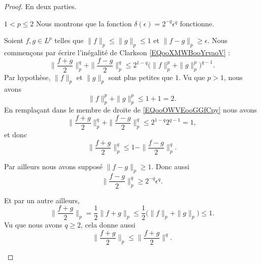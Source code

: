 \begin{proof}
    En deux parties.

    \begin{subproof}
        \item[\( 1<p\leq 2\)]
            Nous montrons que la fonction \( \delta(\epsilon)=2^{-q}\epsilon^q\) fonctionne.
            
            Soient \( f,g\in L^p\) telles que \( \| f \|_p\leq \| g \|_p\leq 1\) et \( \| f-g \|_p\geq \epsilon\). Nous commençons par écrire l'inégalité de Clarkson \eqref{EQooXMWBooYrvaoV} :
            \begin{equation}        \label{EQooOWVEooGGfCpy}
                \| \frac{ f+g }{2} \|_p^q+\| \frac{ f-g }{2} \|_p^q\leq 2^{1-q}\big( \| f \|_p^p+\| g \|_p^p \big)^{q-1}.
            \end{equation}
            Par hypothèse, \( \| f \|_p\) et \( \| g \|_p\) sont plus petites que \( 1\). Vu que \( p>1\), nous avons
            \begin{equation}
                \| f \|_p^p+\| g \|_p^p\leq 1+1=2.
            \end{equation}
            En remplaçant dans le membre de droite de \eqref{EQooOWVEooGGfCpy} nous avons
            \begin{equation}        
                \| \frac{ f+g }{2} \|_p^q+\| \frac{ f-g }{2} \|_p^q\leq 2^{1-q}2^{q-1}=1,
            \end{equation}
            et donc
            \begin{equation}        \label{EQooKARVooDrOuJI}
                \| \frac{ f+g }{2} \|_p^q\leq 1-\| \frac{ f-g }{2} \|_p^q.
            \end{equation}
            
            Par ailleurs nous avons supposé \( \| f-g \|_p\geq 1\). Donc aussi
            \begin{equation}        \label{EQooCGDDooWtDokf}
                \| \frac{ f-g }{2} \|_p^q\geq 2^{-q}\epsilon^q.
            \end{equation}
            
            Et par un autre ailleurs,
            \begin{equation}        \label{EQooOFWYooLVrNDc}
                \| \frac{ f+g }{2} \|_p=\frac{ 1 }{2}\| f+g \|_p\leq \frac{ 1 }{2}\big( \| f \|_p+\| g \|_p \big)\leq 1.
            \end{equation}
            Vu que nous avons \( q\geq 2\), cela donne aussi
            \begin{equation}        \label{EQooGMPRooGiLSss}
                \| \frac{ f+g }{2} \|_p\leq \| \frac{ f+g }{2} \|^q.
            \end{equation}
            

\end{subproof}
\end{proof}

